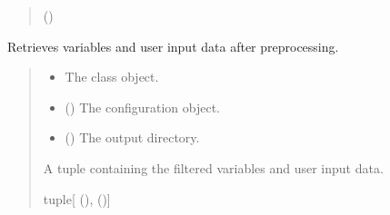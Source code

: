 \documentclass[a4paper,11pt,english,openany]{sphinxmanual}
\begin{document}
\begin{fulllineitems}
\begin{fulllineitems}
\begin{quote}
\begin{description}
\sphinxAtStartPar
{\hyperref[\detokenize{api/spyice.parameters.user_input:spyice.parameters.user_input.UserInput}]{}} ()

\end{description}\end{quote}

\end{fulllineitems}


\begin{fulllineitems}
\label{\detokenize{api/spyice.preprocess.pre_process:spyice.preprocess.pre_process.PreProcess.get_variables}}
\pysigstartsignatures
{}
\pysigstopsignatures
\sphinxAtStartPar
Retrieves variables and user input data after preprocessing.
\begin{quote}\begin{description}
\begin{itemize}
\item {} 
\sphinxAtStartPar
{} \textendash{} The class object.

\item {} 
\sphinxAtStartPar
{} () \textendash{} The configuration object.

\item {} 
\sphinxAtStartPar
{} () \textendash{} The output directory.

\end{itemize}

\sphinxAtStartPar
A tuple containing the filtered variables and user input data.

\sphinxAtStartPar
tuple{[}{\hyperref[\detokenize{api/spyice.preprocess.pre_process:spyice.preprocess.pre_process.PreprocessData}]{}} (), {\hyperref[\detokenize{api/spyice.parameters.user_input:spyice.parameters.user_input.UserInput}]{}} (){]}


\end{description}
\end{quote}
\end{fulllineitems}
\end{fulllineitems}
\end{document}
